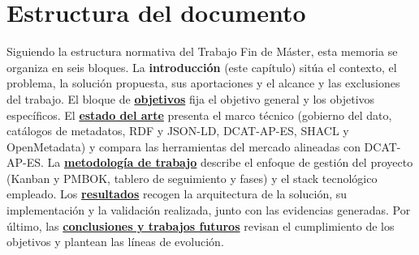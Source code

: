 \section{Estructura del documento}

Siguiendo la estructura normativa del Trabajo Fin de Máster, esta memoria se organiza en seis bloques. La \textbf{introducción} (este capítulo) sitúa el contexto, el problema, la solución propuesta, sus aportaciones y el alcance y las exclusiones del trabajo. El bloque de \hyperref[cap:objetivos]{\textbf{objetivos}} fija el objetivo general y los objetivos específicos. El \hyperref[cap:estado-arte]{\textbf{estado del arte}} presenta el marco técnico (gobierno del dato, catálogos de metadatos, RDF y JSON-LD, DCAT-AP-ES, SHACL y OpenMetadata) y compara las herramientas del mercado alineadas con DCAT-AP-ES. La \hyperref[cap:metodologia]{\textbf{metodología de trabajo}} describe el enfoque de gestión del proyecto (Kanban y PMBOK, tablero de seguimiento y fases) y el stack tecnológico empleado. Los \hyperref[cap:resultados]{\textbf{resultados}} recogen la arquitectura de la solución, su implementación y la validación realizada, junto con las evidencias generadas. Por último, las \hyperref[cap:conclusiones]{\textbf{conclusiones y trabajos futuros}} revisan el cumplimiento de los objetivos y plantean las líneas de evolución.
